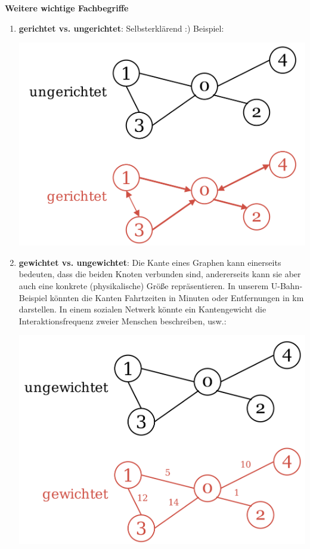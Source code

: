 \documentclass{article}
\begin{document}
\vspace{2mm}
\textbf{Weitere wichtige Fachbegriffe}
\begin{enumerate}
    \item \textbf{gerichtet vs. ungerichtet}: Selbsterklärend :) Beispiel:\begin{center}
        \includegraphics[scale=0.15]{../../media/ungerichtet_gerichtet.png}
    \end{center}
    \item \textbf{gewichtet vs. ungewichtet}: Die Kante eines Graphen kann einerseits bedeuten, dass die beiden Knoten  verbunden sind, andererseits kann sie aber auch eine konkrete (physikalische) Größe repräsentieren. In unserem U-Bahn-Beispiel könnten die Kanten Fahrtzeiten in Minuten oder Entfernungen in km darstellen. In einem sozialen Netwerk könnte ein Kantengewicht die Interaktionsfrequenz zweier Menschen beschreiben, usw.: \begin{center}
        \includegraphics[scale=0.15]{../../media/gewichtet.png}

\end{center}
\end{enumerate}
\end{document}

